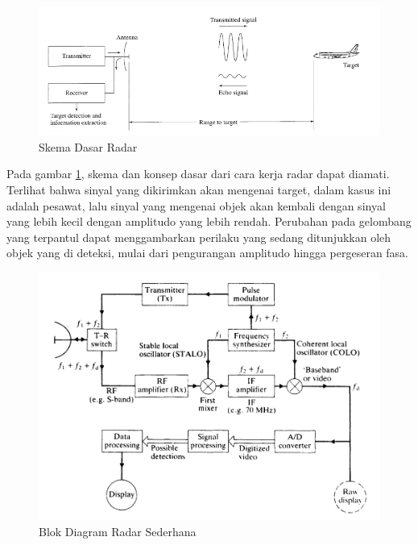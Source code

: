 \begin{figure}
	\begin{center}
		\includegraphics[scale=0.45]{pics/bab2/skemaradar.png} 
		\caption[Skema Dasar Radar]{{Skema Dasar Radar} \cite{Skolnik2001}}
		\label{pic:skemaRadar}
	\end{center}
\end{figure}

Pada gambar \ref{pic:skemaRadar}, skema dan konsep dasar dari cara kerja radar dapat diamati. Terlihat bahwa sinyal yang dikirimkan akan mengenai target, dalam kasus ini adalah pesawat, lalu sinyal yang mengenai objek akan kembali dengan sinyal yang lebih kecil dengan amplitudo yang lebih rendah. Perubahan pada gelombang yang terpantul dapat menggambarkan perilaku yang sedang ditunjukkan oleh objek yang di deteksi, mulai dari pengurangan amplitudo hingga pergeseran fasa.

\begin{figure}
	\begin{center}
		\includegraphics[scale=0.4]{pics/bab2/blokdiagram.png} 
		\caption[Blok Diagram Radar]{{Blok Diagram Radar Sederhana \cite{Kingsley1999}}}
		\label{pic:blokdiagram}
	\end{center}
\end{figure}

